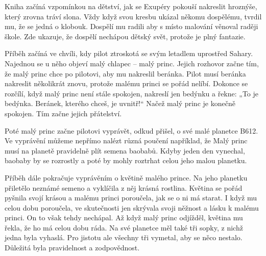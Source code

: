 \documentclass[../ctenarsky-denik.tex]{subfiles}
\begin{document}

Kniha začíná vzpomínkou na dětství, jak se Exupéry pokouší nakreslit hroznýše, který zrovna tráví slona. Vždy když svou kresbu ukázal někomu dospělému, tvrdil mu, že se jedná o klobouk. Dospělí mu radili aby s místo malování věnoval raději škole. Zde ukazuje, že dospělí nechápou dětský svět, protože je plný fantazie.

Příběh začíná ve chvíli, kdy pilot ztroskotá se svým letadlem uprostřed Sahary. Najednou se u něho objeví malý chlapec – malý princ. Jejich rozhovor začne tím, že malý princ chce po pilotovi, aby mu nakreslil beránka. Pilot musí beránka nakreslit několikrát znovu, protože malému princi se pořád nelíbí. Dokonce se rozčílí, když malý princ není stále spokojen, nakreslí jen bedýnku a řekne: „To je bedýnka. Beránek, kterého chceš, je uvnitř!“ Načež malý princ je konečně spokojen. Tím začne jejich přátelství.

Poté malý princ začne pilotovi vyprávět, odkud přišel, o své malé planetce B612. Ve vyprávění můžeme nepřímo nalézt různá poučení například, že Malý princ musí na planetě pravidelně plít semena baobabů. Kdyby jeden den vynechal, baobaby by se rozrostly a poté by mohly roztrhat celou jeho malou planetku.

Příběh dále pokračuje vyprávěním o květině malého prince. Na jeho planetku přiletělo neznámé semeno a vyklíčila z něj krásná rostlina. Květina se pořád pyšnila svojí krásou a malému princi poroučela, jak se o ni má starat. I když mu celou dobu poroučela, ve skutečnosti jen skrývala svoji něžnost a lásku k malému princi. On to však tehdy nechápal. Až když malý princ odjížděl, květina mu řekla, že ho má celou dobu ráda. Na své planetce měl také tři sopky, z nichž jedna byla vyhaslá. Pro jistotu ale všechny tři vymetal, aby se něco nestalo. Důležitá byla pravidelnost a zodpovědnost.
\end{document}
